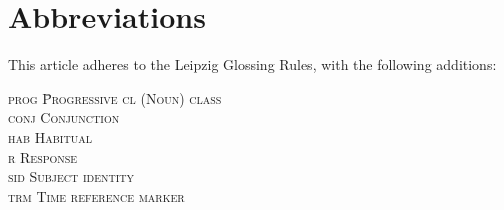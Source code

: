 \documentclass[output=paper,colorlinks,citecolor=brown]{langscibook}
\begin{document}
\section*{Abbreviations}
This article adheres to the Leipzig Glossing Rules, with the following additions:
    \begin{multicols}{2}
	\begin{tabbing}
        \scshape prog \hspace{1ex} \= Progressive\kill
		\scshape cl \> (Noun) class\\
		\scshape conj \> Conjunction\\
		\scshape hab \> Habitual\\
		\scshape r \> Response\\
		\scshape sid \> Subject identity\\
		\scshape trm \> Time reference marker
	\end{tabbing}
    \end{multicols}

{\sloppy\printbibliography[heading=subbibliography,notkeyword=this]}
\end{document}

